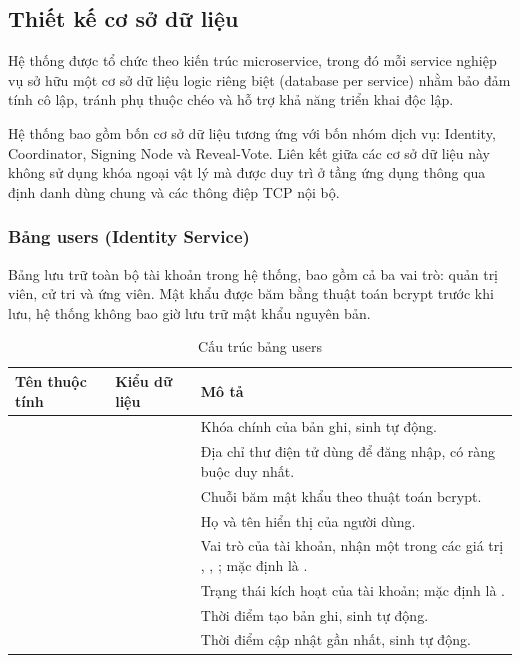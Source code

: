 \subsection{Thiết kế cơ sở dữ liệu}

Hệ thống được tổ chức theo kiến trúc microservice, trong đó mỗi service nghiệp vụ sở hữu một cơ sở dữ liệu logic riêng biệt (database per service) nhằm bảo đảm tính cô lập, tránh phụ thuộc chéo và hỗ trợ khả năng triển khai độc lập.

Hệ thống bao gồm bốn cơ sở dữ liệu tương ứng với bốn nhóm dịch vụ: Identity, Coordinator, Signing Node và Reveal-Vote. Liên kết giữa các cơ sở dữ liệu này không sử dụng khóa ngoại vật lý mà được duy trì ở tầng ứng dụng thông qua định danh  dùng chung và các thông điệp TCP nội bộ.

\subsubsection{Bảng users (Identity Service)}

Bảng  lưu trữ toàn bộ tài khoản trong hệ thống, bao gồm cả ba vai trò: quản trị viên, cử tri và ứng viên. Mật khẩu được băm bằng thuật toán bcrypt trước khi lưu, hệ thống không bao giờ lưu trữ mật khẩu nguyên bản.

\begin{table}[H]
    \centering
    \small
    \setlength{\tabcolsep}{3pt}
    \caption{Cấu trúc bảng users}
    \label{tab:db-users}
    \begin{tabularx}{\textwidth}{|L{0.25}|L{0.25}|L{0.50}|}
    \hline
    \textbf{Tên thuộc tính} & \textbf{Kiểu dữ liệu} & \textbf{Mô tả} \\
    \hline
            &   & Khóa chính của bản ghi, sinh tự động. \\ \hline
         &     & Địa chỉ thư điện tử dùng để đăng nhập, có ràng buộc duy nhất. \\ \hline
      &     & Chuỗi băm mật khẩu theo thuật toán bcrypt. \\ \hline
          &     & Họ và tên hiển thị của người dùng. \\ \hline
          &  & Vai trò của tài khoản, nhận một trong các giá trị , , ; mặc định là . \\ \hline
      &    & Trạng thái kích hoạt của tài khoản; mặc định là . \\ \hline
     &   & Thời điểm tạo bản ghi, sinh tự động. \\ \hline
     &   & Thời điểm cập nhật gần nhất, sinh tự động. \\ \hline
    \end{tabularx}
\end{table}

